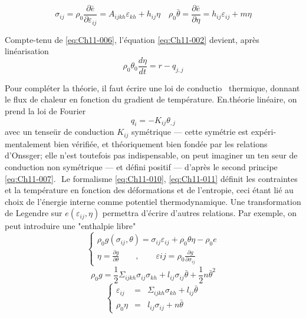 \begin{equation}
    \sigma_{ij} = \rho_0 \frac{\partial \bar{e}}{\partial \varepsilon_{ij}} = A_{ijkh} \varepsilon_{kh} + h_{ij} \eta \quad \rho_0 \bar{\theta} = \frac{\partial \bar{e}}{\partial \eta} = h_{ij} \varepsilon_{ij} + m \eta
    \label{eq:Ch11-011}
\end{equation}

Compte-tenu de \eqref{eq:Ch11-006}, l'équation \eqref{eq:Ch11-002} devient, après linéarisation 
\begin{equation}
    \rho_0 \theta_0 \frac{d \eta}{dt} = r - q_{j,j}
    \label{eq:Ch11-013}
\end{equation}

Pour compléter la théorie, il faut écrire une loi de conductio~ thermique, donnant le flux de chaleur en fonction du gradient de température. En.théorie linéaire, on prend la loi de Fourier 
\begin{equation}
    q_i = -K_{ij} \theta_{,j}
    \label{eq:Ch11-013}
\end{equation}
avec un tenseür de conduction $K_{ij}$ symétrique --- cette symétrie est expéri­mentalement bien vérifiée, et théoriquement bien fondée par les relations d'Onssger; elle n'est toutefois pas indispensable, on peut imaginer un ten­
seur de conduction non symétrique --- et défini positif --- d'après le second principe \eqref{eq:Ch11-007}.
 ­
Le formalisme \eqref{eq:Ch11-010}, \eqref{eq:Ch11-011} définit les contraintes et la température en fonction des déformations et de l'entropie, ceci étant lié au choix de l'énergie interne comme potentiel thermodynamique. Une transformation de Le­gendre sur $e(\varepsilon_{ij},\eta)$ permettra d'écrire d'autres relations. Par exemple, on peut introduire une "enthalpie libre"
\begin{equation}
 \left\{
  \begin{aligned}
    \rho_0 g(\sigma_{ij},\theta) = \sigma_{ij}\varepsilon_{ij} + \rho_0 \theta \eta - \rho_0 e \\
    \eta = \frac{\partial g}{\partial \theta} \qquad,\qquad \varepsilon{ij} = \rho_0 \frac{\partial g}{\partial \sigma_{ij}}
  \end{aligned}
  \right.
    \label{eq:Ch11-014}
\end{equation}
\begin{equation}
    \rho_0 g = \frac{1}{2} \Sigma_{ijkh} \sigma_{ij}\sigma_{kh} + l_{ij} \sigma_{ij} \bar{\theta} +\frac{1}{2} n \bar{\theta}^2
    \label{eq:Ch11-015}
\end{equation}
\begin{equation}
 \left\{
  \begin{aligned}
    \varepsilon_{ij} & = & \Sigma_{ijkh} \sigma_{kh} + l_{ij} \bar{\theta} \\
    \rho_0 \eta      & = & l_{ij} \sigma_{ij} + n \bar{\theta}
  \end{aligned}
  \right.
    \label{eq:Ch11-016}
\end{equation}
